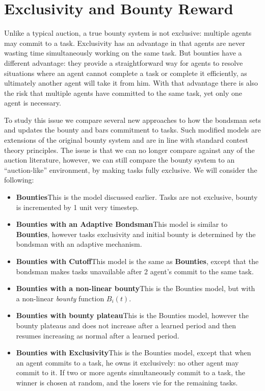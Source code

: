 \documentclass[letterpaper]{aamas2015}
\begin{document}
\section{Exclusivity and Bounty Reward}

Unlike a typical auction, a true bounty system is not exclusive: multiple agents may commit to a task.  Exclusivity has an advantage in that agents are never wasting time simultaneously working on the same task.  But bounties have a different advantage: they provide a straightforward way for agents to resolve situations where an agent cannot complete a task or complete it efficiently, as  ultimately another agent will take it from him.  With that advantage there is also the risk that multiple agents have committed to the same task, yet only one agent is necessary.  

To study this issue we compare several new approaches to how the bondsman sets and updates the bounty and bars commitment to tasks.  Such modified models are extensions of the original bounty system and are in line with standard contest theory principles.  The issue is that we can no longer compare against any of the auction literature, however, we can still compare the bounty system to an ``auction-like'' environment, by making tasks fully exclusive.  We will consider the following: 

\begin{itemize}
\item {\bf Bounties}\quad This is the model discussed earlier.  Tasks are not exclusive, bounty is incremented by 1 unit very timestep.
\item {\bf Bounties with an Adaptive Bondsman}\quad This model is similar to {\bf Bounties}, however tasks exclusivity and initial bounty is determined by the bondsman with an adaptive mechanism.
\item {\bf Bounties with Cutoff}\quad This model is the same as {\bf Bounties}, except that the bondsman makes tasks unavailable after 2 agent's commit to the same task.  
\item {\bf Bounties with a non-linear bounty}\quad This is the Bounties model, but with a non-linear {\it bounty} function \(B_{i}(t)\).
\item {\bf Bounties with bounty plateau}\quad This is the Bounties model, however the bounty plateaus and does not increase after a learned period and then resumes increasing as normal after a learned period.
\item {\bf Bounties with Exclusivity}\quad This is the Bounties model, except that when an agent commits to a task, he owns it exclusively: no other agent may commit to it.  If two or more agents simultaneously commit to a task, the winner is chosen at random, and the losers vie for the remaining tasks.
\end{itemize}
\end{document}
